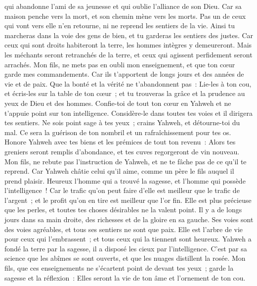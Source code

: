 \begin{multicols}{2}
qui abandonne l'ami de sa jeunesse et qui oublie l'alliance de son Dieu.
Car sa maison penche vers la mort, et son chemin mène vers les morts.
Pas un de ceux qui vont vers elle n'en retourne, ni ne reprend les sentiers de la vie.
Ainsi tu marcheras dans la voie des gens de bien, et tu garderas les sentiers des justes.
Car ceux qui sont droits habiteront la terre, les hommes intègres y demeureront.
Mais les méchants seront retranchés de la terre, et ceux qui agissent perfidement seront arrachés.
\VerseOne{}Mon fils, ne mets pas en oubli mon enseignement, et que ton cœur garde mes commandements.
Car ils t'apportent de longs jours et des années de vie et de paix.
Que la bonté et la vérité ne t'abandonnent pas~: Lie-les à ton cou, et écris-les sur la table de ton cœur~;
et tu trouveras la grâce et la prudence au yeux de Dieu et des hommes.
Confie-toi de tout ton cœur en Yahweh et ne t'appuie point sur ton intelligence.
Considère-le dans toutes tes voies et il dirigera tes sentiers.
Ne sois point sage à tes yeux~; crains Yahweh, et détourne-toi du mal.
Ce sera la guérison de ton nombril et un rafraîchissement pour tes os.
Honore Yahweh avec tes biens et les prémices de tout ton revenu~:
Alors tes greniers seront remplis d'abondance, et tes cuves regorgeront de vin nouveau.
Mon fils, ne rebute pas l'instruction de Yahweh, et ne te fâche pas de ce qu'il te reprend.
Car Yahweh châtie celui qu'il aime, comme un père le fils auquel il prend plaisir.
Heureux l'homme qui a trouvé la sagesse, et l'homme qui possède l'intelligence~!
Car le trafic qu'on peut faire d'elle est meilleur que le trafic de l'argent~; et le profit qu'on en tire est meilleur que l'or fin.
Elle est plus précieuse que les perles, et toutes tes choses désirables ne la valent point.
Il y a de longs jours dans sa main droite, des richesses et de la gloire en sa gauche.
Ses voies sont des voies agréables, et tous ses sentiers ne sont que paix.
Elle est l'arbre de vie pour ceux qui l'embrassent~; et tous ceux qui la tiennent sont heureux.
Yahweh a fondé la terre par la sagesse, il a disposé les cieux par l'intelligence.
C'est par sa science que les abîmes se sont ouverts, et que les nuages distillent la rosée.
Mon fils, que ces enseignements ne s'écartent point de devant tes yeux~; garde la sagesse et la réflexion~:
Elles seront la vie de ton âme et l'ornement de ton cou.

\end{multicols}
